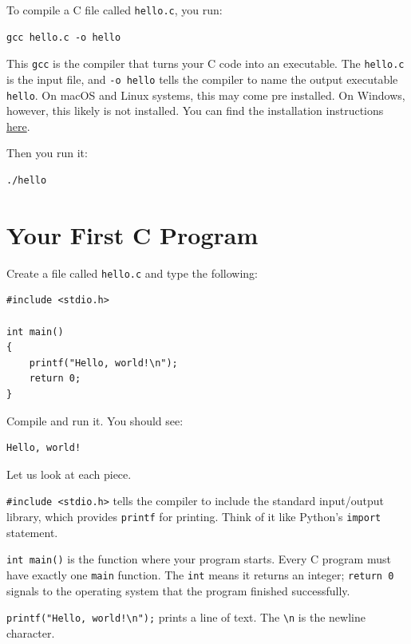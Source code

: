 To compile a C file called \texttt{hello.c}, you run:

\begin{verbatim}
gcc hello.c -o hello
\end{verbatim}

This \texttt{gcc} is the compiler that turns your C code into an executable.  The \texttt{hello.c} is the input file, and \texttt{-o hello} tells the compiler to name the output executable \texttt{hello}. On macOS and Linux systems, this may come pre installed. On Windows, however, this likely is not installed. You can find the installation instructions \href{https://www.mingw-w64.org/downloads/}{here}.

Then you run it:

\begin{verbatim}
./hello
\end{verbatim}

\section{Your First C Program}

Create a file called \texttt{hello.c} and type the following:

\begin{verbatim}
#include <stdio.h>

int main()
{
    printf("Hello, world!\n");
    return 0;
}
\end{verbatim}

Compile and run it.  You should see:

\begin{verbatim}
Hello, world!
\end{verbatim}

Let us look at each piece.

\texttt{\#include <stdio.h>} tells the compiler to include the standard
input/output library, which provides \texttt{printf} for printing.
Think of it like Python's \texttt{import} statement.

\texttt{int main()} is the function where your program starts.  Every
C program must have exactly one \texttt{main} function.  The \texttt{int}
means it returns an integer; \texttt{return 0} signals to the operating
system that the program finished successfully.

\texttt{printf("Hello, world!\textbackslash n");} prints a line of text.
The \texttt{\textbackslash n} is the newline character.

